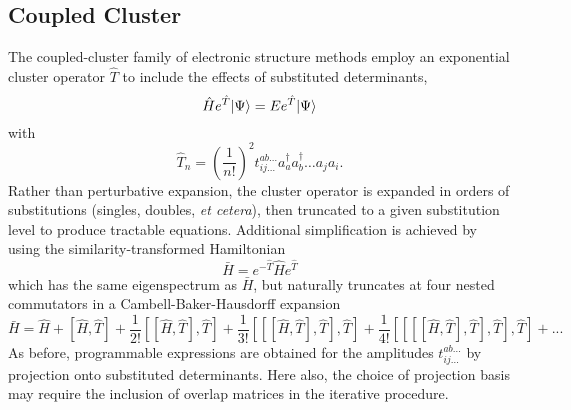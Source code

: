 \subsection{Coupled Cluster} \label{ss:cc}
The coupled-cluster family of electronic structure methods employ an exponential cluster operator $\hat{T}$ to include the effects of substituted determinants,
\begin{equation} \label{eq:cc_TDSE}
    \hat{H}e^{\hat{T}}| \Psi \rangle = Ee^{\hat{T}}| \Psi \rangle
\end{equation}
with
\begin{equation} \label{eq:T}
    \hat{T}_n = \left(\frac{1}{n!}\right)^2 t_{ij\ldots}^{ab\ldots}a_a^{\dagger}a_b^{\dagger}\ldots a_j a_i.
\end{equation}
Rather than perturbative expansion, the cluster operator is expanded in orders of substitutions (singles, doubles, \textit{et cetera}), then truncated to a given substitution level to produce tractable equations. Additional simplification is achieved by using the similarity-transformed Hamiltonian
\begin{equation} \label{eq:Hbar}
    \bar{H} = e^{-\hat{T}}\hat{H}e^{\hat{T}}
\end{equation}
which has the same eigenspectrum as $\bar{H}$, but naturally truncates at four nested commutators in a Cambell-Baker-Hausdorff expansion
\begin{equation} \label{eq:cbh}
    \bar{H} = \hat{H} + [\hat{H}, \hat{T}] + \frac{1}{2!}[[\hat{H}, \hat{T}], \hat{T}] + \frac{1}{3!}[[[\hat{H}, \hat{T}], \hat{T}], \hat{T}] + \frac{1}{4!}[[[[\hat{H}, \hat{T}], \hat{T}], \hat{T}], \hat{T}] + . . .
\end{equation}
As before, programmable expressions are obtained for the amplitudes $t_{ij\ldots}^{ab\ldots}$ by projection onto substituted determinants. Here also, the choice of projection basis may require the inclusion of overlap matrices in the iterative procedure. 

